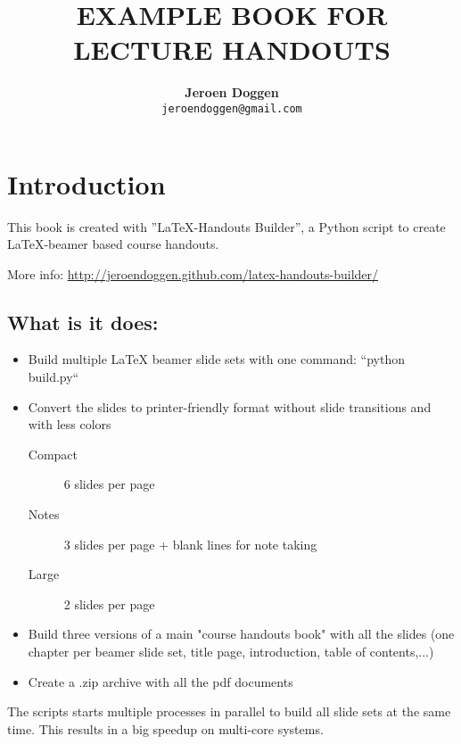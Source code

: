 \documentclass{book}
\title{\LARGE \textbf{\uppercase{ Example Book for Lecture  Handouts}}}
\author{\textbf{Jeroen Doggen}  \\
        \texttt{jeroendoggen@gmail.com}
}
\begin{document}
\maketitle
\tableofcontents

\chapter*{Introduction}
\label{chap_intro}

This book is created with ''\LaTeX -Handouts Builder'', a Python script to create \LaTeX-beamer based course handouts.

\noindent More info: \url{http://jeroendoggen.github.com/latex-handouts-builder/}


\section*{What is it does:}

\begin{itemize}
\item Build multiple LaTeX beamer slide sets with one command: ``python build.py``
\item Convert the slides to printer-friendly format without slide transitions and with less colors
\begin{description}
 \item[Compact] 6 slides per page
 \item[Notes] 3 slides per page + blank lines for note taking
 \item[Large] 2 slides per page
\end{description}
\item Build three versions of a main "course handouts book" with all the slides (one chapter per beamer slide set, title page, introduction, table of contents,...)
\item Create a .zip archive with all the pdf documents
\end{itemize}

\noindent The scripts starts multiple processes in parallel to build all slide sets at the same time. This results in a big speedup on multi-core systems.
\end{document}
